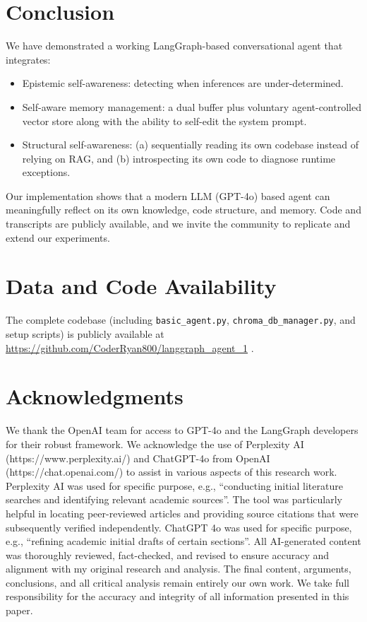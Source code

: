 \documentclass[conference]{IEEEtran}
\begin{document}
\section{Conclusion}
We have demonstrated a working LangGraph-based conversational agent that integrates:
\begin{itemize}[leftmargin=*]
\item Epistemic self-awareness: detecting when inferences are under-determined.
\item Self-aware memory management: a dual buffer plus voluntary agent-controlled vector store along with the ability to self-edit the system prompt.
\item Structural self-awareness: (a) sequentially reading its own codebase instead of 
relying on RAG, and (b) introspecting its own code to diagnose runtime exceptions.
\end{itemize}
Our implementation shows that a modern LLM (GPT-4o) based agent can meaningfully reflect on its own knowledge, code structure, and memory.  Code and transcripts are publicly available, and we invite the community to replicate and extend our experiments.  

\section*{Data and Code Availability}
The complete codebase (including \texttt{basic\_agent.py}, 
\texttt{chroma\_db\_manager.py}, and setup scripts) is 
publicly available at \url{https://github.com/CoderRyan800/langgraph_agent_1} \cite{LangGraphAgent2025}.


\section*{Acknowledgments}
We thank the OpenAI team for  access to GPT-4o and the LangGraph developers for their robust framework.
We acknowledge the use of Perplexity AI (https://www.perplexity.ai/) and ChatGPT-4o from OpenAI
(https://chat.openai.com/) to assist in various aspects of this research work.
Perplexity AI was used for specific purpose, e.g., ``conducting initial literature searches 
and identifying relevant academic sources''. The tool was particularly helpful in 
locating peer-reviewed articles and providing source citations that were subsequently verified independently.
ChatGPT 4o was used for specific purpose, e.g., ``refining academic initial drafts 
of certain sections''. All AI-generated content was thoroughly reviewed, fact-checked, 
and revised to ensure accuracy and alignment with my original research and analysis.
The final content, arguments, conclusions, and all critical analysis remain 
entirely our own work. We take full responsibility for the accuracy and integrity 
of all information presented in this paper.



\end{document}
